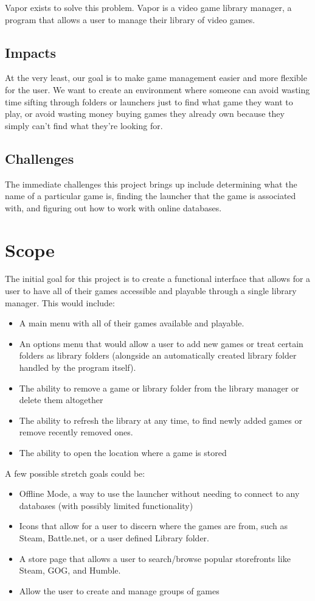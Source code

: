 \documentclass[10pt,conference,onecolumn,compsoc]{IEEEtran}
\begin{document}
Vapor exists to solve this problem. Vapor is a video game library manager, a program that allows a user to manage their library of video games.

\subsection{Impacts}
At the very least, our goal is to make game management easier and more flexible for the user. We want to create an environment where someone can avoid wasting time sifting through folders or launchers just to find what game they want to play, or avoid wasting money buying games they already own because they simply can't find what they're looking for.

\subsection{Challenges}
The immediate challenges this project brings up include determining what the name of a particular game is, finding the launcher that the game is associated with, and figuring out how to work with online databases.

\section{Scope}
The initial goal for this project is to create a functional interface that allows for a user to have all of their games accessible and playable through a single library manager. This would include:

\begin{itemize}
\item A main menu with all of their games available and playable.
\item An options menu that would allow a user to add new games or treat certain folders as library folders (alongside an automatically created library folder handled by the program itself).
\item The ability to remove a game or library folder from the library manager or delete them altogether
\item The ability to refresh the library at any time, to find newly added games or remove recently removed ones.
\item The ability to open the location where a game is stored
\end{itemize}

A few possible stretch goals could be:

\begin{itemize}
\item Offline Mode, a way to use the launcher without needing to connect to any databases (with possibly limited functionality)
\item Icons that allow for a user to discern where the games are from, such as Steam, Battle.net, or a user defined Library folder.
\item A store page that allows a user to search/browse popular storefronts like Steam, GOG, and Humble.
\item Allow the user to create and manage groups of games
\end{itemize}
\end{document}
